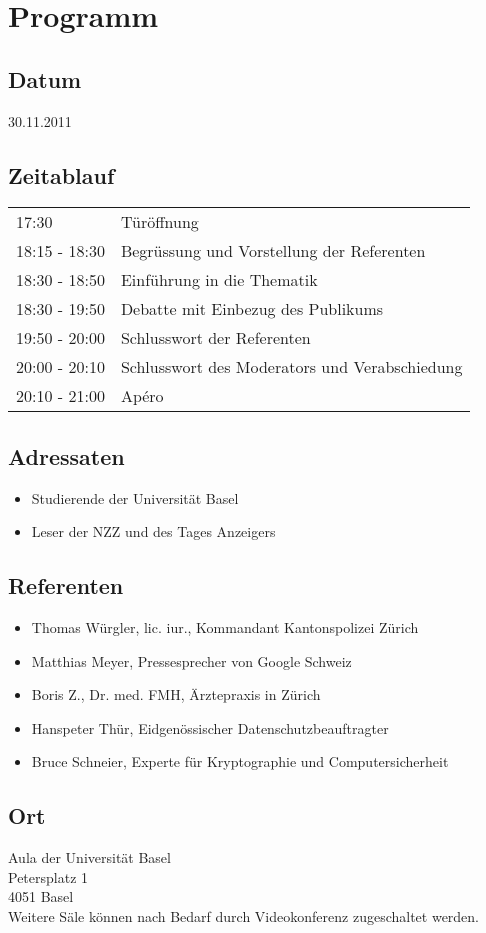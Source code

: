 \section{Programm}
\subsection*{Datum}
30.11.2011

\subsection*{Zeitablauf}
\begin{tabular}{ll}
17:30	& Türöffnung\\
18:15 - 18:30 & Begrüssung und Vorstellung der Referenten \\
18:30 - 18:50 & Einführung in die Thematik \\
18:30 - 19:50 & Debatte mit Einbezug des Publikums\\
19:50 - 20:00 & Schlusswort der Referenten\\
20:00 - 20:10 & Schlusswort des Moderators und Verabschiedung\\
20:10 - 21:00 & Apéro\\
\end{tabular}

\subsection*{Adressaten}
\begin{itemize}
 \item Studierende der Universität Basel
 \item Leser der NZZ und des Tages Anzeigers
\end{itemize}


\subsection*{Referenten}
\begin{itemize}
\item Thomas Würgler, lic. iur., Kommandant Kantonspolizei Zürich
\item Matthias Meyer, Pressesprecher von Google Schweiz
\item Boris Z., Dr. med. FMH, Ärztepraxis in Zürich
\item Hanspeter Thür, Eidgenössischer Datenschutzbeauftragter
\item Bruce Schneier, Experte für Kryptographie und Computersicherheit
\end{itemize}

\subsection*{Ort}
Aula der Universit\"at Basel\\
Petersplatz 1\\
4051 Basel\\
\newline
Weitere S\"ale k\"onnen nach Bedarf durch Videokonferenz zugeschaltet werden.
